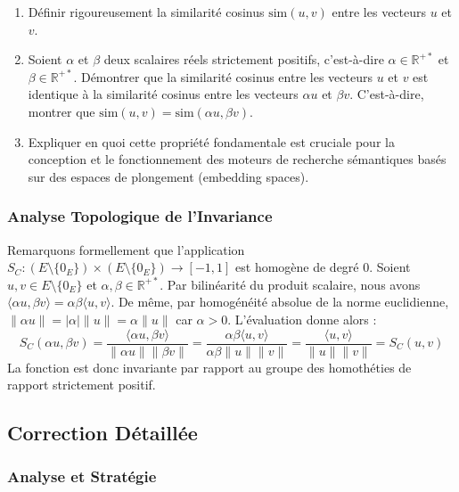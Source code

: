 \documentclass[11pt,a4paper]{report}
\begin{document}
\begin{enumerate}
\def\labelenumi{\arabic{enumi}.}

\item
  Définir rigoureusement la similarité cosinus \(\text{sim}(u, v)\)
  entre les vecteurs \(u\) et \(v\).
\item
  Soient \(\alpha\) et \(\beta\) deux scalaires réels strictement
  positifs, c'est-à-dire \(\alpha \in \mathbb{R}^{+*}\) et
  \(\beta \in \mathbb{R}^{+*}\). Démontrer que la similarité cosinus
  entre les vecteurs \(u\) et \(v\) est identique à la similarité
  cosinus entre les vecteurs \(\alpha u\) et \(\beta v\). C'est-à-dire,
  montrer que \(\text{sim}(u, v) = \text{sim}(\alpha u, \beta v)\).
\item
  Expliquer en quoi cette propriété fondamentale est cruciale pour la
  conception et le fonctionnement des moteurs de recherche sémantiques
  basés sur des espaces de plongement (embedding spaces).
\end{enumerate}

\hypertarget{analyse-topologique-de-linvariance}{%
\subsubsection{Analyse Topologique de
l'Invariance}\label{analyse-topologique-de-linvariance}}

Remarquons formellement que l'application
\(S_C : (E \setminus \{0_E\}) \times (E \setminus \{0_E\}) \to [-1, 1]\)
est homogène de degré \(0\). Soient \(u, v \in E \setminus \{0_E\}\) et
\(\alpha, \beta \in \mathbb{R}^{+*}\). Par bilinéarité du produit
scalaire, nous avons
\(\langle \alpha u, \beta v \rangle = \alpha \beta \langle u, v \rangle\).
De même, par homogénéité absolue de la norme euclidienne,
\(\|\alpha u\| = |\alpha| \|u\| = \alpha \|u\|\) car \(\alpha > 0\).
L'évaluation donne alors :
\[ S_C(\alpha u, \beta v) = \frac{\langle \alpha u, \beta v \rangle}{\|\alpha u\| \|\beta v\|} = \frac{\alpha \beta \langle u, v \rangle}{\alpha \beta \|u\| \|v\|} = \frac{\langle u, v \rangle}{\|u\| \|v\|} = S_C(u, v) \]
La fonction est donc invariante par rapport au groupe des homothéties de
rapport strictement positif.

\hypertarget{correction-duxe9tailluxe9e}{%
\subsection{Correction Détaillée}\label{correction-duxe9tailluxe9e}}

\hypertarget{analyse-et-stratuxe9gie}{%
\subsubsection{Analyse et Stratégie}\label{analyse-et-stratuxe9gie}}
\end{document}
